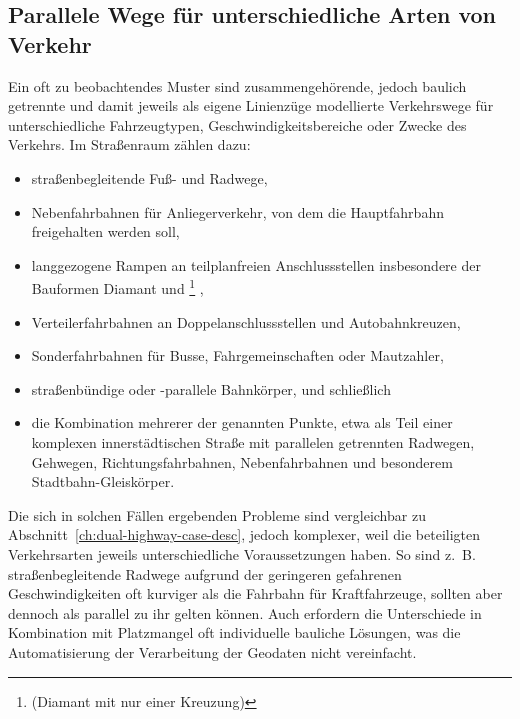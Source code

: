 \documentclass[../main/thesis.tex]{subfiles}
\begin{document}
\subsection{Parallele Wege für unterschiedliche Arten von Verkehr}
\label{ch:different-traffic-types-case-desc}

Ein oft zu beobachtendes Muster sind zusammengehörende, jedoch baulich getrennte und damit jeweils als eigene Linienzüge modellierte Verkehrswege für unterschiedliche Fahrzeugtypen, Geschwindigkeitsbereiche oder Zwecke des Verkehrs.
Im Straßenraum zählen dazu:

\begin{itemize}
	\item straßenbegleitende Fuß- und Radwege,
	\item Nebenfahrbahnen  für Anliegerverkehr, von dem die Hauptfahrbahn freigehalten werden soll,
	\item langgezogene Rampen an teilplanfreien Anschlussstellen insbesondere der Bauformen Diamant und %
		\footnote{ (Diamant mit nur einer Kreuzung) }%
		,
	\item Verteilerfahrbahnen an Doppelanschlussstellen und Autobahnkreuzen,
	\item Sonderfahrbahnen für Busse, Fahrgemeinschaften oder Mautzahler,
	\item straßenbündige oder -parallele Bahnkörper, und schließlich
	\item die Kombination mehrerer der genannten Punkte, etwa als Teil einer komplexen innerstädtischen Straße mit parallelen getrennten Radwegen, Gehwegen, Richtungsfahrbahnen, Nebenfahrbahnen und besonderem Stadtbahn-Gleiskörper.
\end{itemize}

Die sich in solchen Fällen ergebenden Probleme sind vergleichbar zu Abschnitt~\ref{ch:dual-highway-case-desc}, jedoch komplexer, weil die beteiligten Verkehrsarten jeweils unterschiedliche Voraussetzungen haben.
So sind z.~B. straßenbegleitende Radwege aufgrund der geringeren gefahrenen Geschwindigkeiten oft kurviger als die Fahrbahn für Kraftfahrzeuge, sollten aber dennoch als parallel zu ihr gelten können.
Auch erfordern die Unterschiede in Kombination mit Platzmangel oft individuelle bauliche Lösungen, was die Automatisierung der Verarbeitung der Geodaten nicht vereinfacht.
\end{document}
